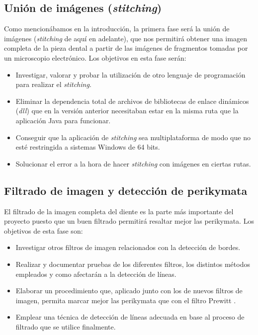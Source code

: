 \subsection{Unión de imágenes (\textit{stitching})}
Como mencionábamos en la introducción, la primera fase será la unión de imágenes (\textit{stitching} de aquí en adelante), que nos permitirá obtener una imagen completa de la pieza dental a partir de las imágenes de fragmentos tomadas por un microscopio electrónico. Los objetivos en esta fase serán:
\begin{itemize}
    \item Investigar, valorar y probar la utilización de otro lenguaje de programación para realizar el \textit{stitching}.
    \item Eliminar la dependencia total de archivos de bibliotecas de enlace dinámicos (\textit{dll}) que en la versión anterior necesitaban estar en la misma ruta que la aplicación Java para funcionar.
    \item Conseguir que la aplicación de \textit{stitching} sea multiplataforma de modo que no esté restringida a sistemas Windows de 64 bits. 
    \item Solucionar el error a la hora de hacer \textit{stitching} con imágenes en ciertas rutas.
\end{itemize}

\subsection{Filtrado de imagen y detección de perikymata}
El filtrado de la imagen completa del diente es la parte más importante del proyecto puesto que un buen filtrado permitirá resaltar mejor las perikymata. Los objetivos de esta fase son:
\begin{itemize}
    \item Investigar otros filtros de imagen relacionados con la detección de bordes.
    \item Realizar y documentar pruebas de los diferentes filtros, los distintos métodos empleados y como afectarán a la detección de líneas.
    \item Elaborar un procedimiento que, aplicado junto con los de nuevos filtros de imagen, permita marcar mejor las perikymata que con el filtro Prewitt \cite{wiki:Prewitt}.
    \item Emplear una técnica de detección de líneas adecuada en base al proceso de filtrado que se utilice finalmente.
\end{itemize}

